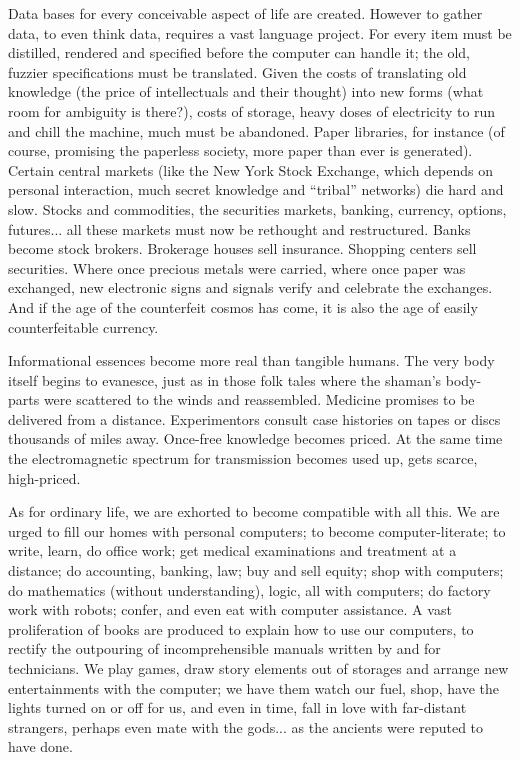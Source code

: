 Data bases for every conceivable aspect of
life are created. However to gather data, to
even think data, requires a vast language
project. For every item must be distilled,
rendered and specified before the computer
can handle it; the old, fuzzier specifications
must be translated. Given the costs of translating 
old knowledge (the price of intellectuals 
and their thought) into new forms (what
room for ambiguity is there?), costs of storage,
heavy doses of electricity to run and
chill the machine, much must be abandoned.
Paper libraries, for instance (of course, promising
the paperless society, more paper than
ever is generated). Certain central markets
(like the New York Stock Exchange, which
depends on personal interaction, 
much secret knowledge and \enquote{tribal} networks) die
hard and slow. Stocks and commodities, the
securities markets, banking, currency, options, 
futures... all these markets must now
be rethought and restructured. Banks become
stock brokers. Brokerage houses sell
insurance. Shopping centers sell securities.
Where once precious metals were carried,
where once paper was exchanged, new electronic
signs and signals verify and celebrate
the exchanges. And if the age of the counterfeit
cosmos has come, it is also the age of
easily counterfeitable currency.

Informational essences become more real
than tangible humans. The very body itself
begins to evanesce, just as in those folk tales
where the shaman's body-parts were scattered 
to the winds and reassembled. Medicine
promises to be delivered from a distance.
Experimentors consult case histories
on tapes or discs thousands of miles away.
Once-free knowledge becomes priced. At
the same time the electromagnetic spectrum
for transmission becomes used up, gets
scarce, high-priced.

As for ordinary life, we are exhorted to
become compatible with all this. We are
urged to fill our homes with personal computers;
to become computer-literate; to write,
learn, do office work; get medical examinations 
and treatment at a distance; do accounting, 
banking, law; buy and sell equity;
shop with computers; do mathematics (without
understanding), logic, all with computers; 
do factory work with robots; confer, and
even eat with computer assistance. A vast
proliferation of books are produced to explain
how to use our computers, to rectify
the outpouring of incomprehensible manuals
written by and for technicians. We play
games, draw story elements out of storages
and arrange new entertainments with the
computer; we have them watch our fuel,
shop, have the lights turned on or off for us,
and even in time, fall in love with far-distant
strangers, perhaps even mate with the gods...
as the ancients were reputed to have
done.

